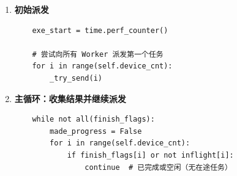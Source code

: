 \documentclass[12pt,a4paper]{article}
\begin{document}
\begin{enumerate}
    \textbf{\_task\_ready}：检查任务是否满足依赖关系
    \begin{lstlisting}
    def _task_ready(task: Dict) -> bool:
        """
        True if this task can be dispatched:
        - Non-execute commands are always ready.
        - For execute(op, query_ids): all parents' outputs exist for every query.
        """
        if task.get("command") != "execute":
            return True
        op, query_ids = task["params"][0], task["params"][1]
        if not getattr(op, "input_ops", None):
            return True  # 起始节点，无依赖
        parent_ids = [p.id for p in op.input_ops]
        for qid in query_ids:
            q = self.req_id_map[qid]
            for pid in parent_ids:
                if pid not in q.op_output:
                    return False  # 某个父节点输出未就绪
        return True
    \end{lstlisting}
    
    \textbf{\_try\_send}：尝试向 Worker 发送下一个任务
    \begin{lstlisting}
    def _try_send(i: int) -> None:
        """
        Attempt to send the current task for worker i if:
          - worker not finished,
          - no task currently in flight on that worker,
          - task exists and all dependencies are satisfied.
        """
        if finish_flags[i] or inflight[i]:
            return
        
        if worker_pointer[i] >= len(self.workflows[i]):
            # 该 Worker 的所有任务已完成
            finish_flags[i] = True
            if not skip_exit:
                self.cmd_queues[i].put(("exit", ()))
            return
        
        task = self.workflows[i][worker_pointer[i]]
        if _task_ready(task):
            self.cmd_queues[i].put(_cmd_transfer(task))
            inflight[i] = True  # 标记为正在执行
    \end{lstlisting}
    
    \item \textbf{初始派发}
    \begin{lstlisting}
    exe_start = time.perf_counter()
    
    # 尝试向所有 Worker 派发第一个任务
    for i in range(self.device_cnt):
        _try_send(i)
    \end{lstlisting}
    
    \item \textbf{主循环：收集结果并继续派发}
    \begin{lstlisting}
    while not all(finish_flags):
        made_progress = False
        for i in range(self.device_cnt):
            if finish_flags[i] or not inflight[i]:
                continue  # 已完成或空闲（无在途任务）
            

\end{lstlisting}
\end{enumerate}
\end{document}
